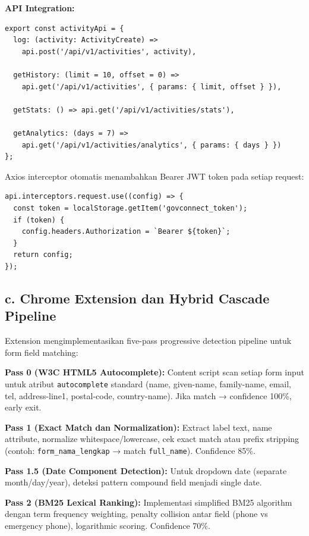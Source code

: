 \documentclass[12pt,a4paper]{article}
\begin{document}
\textbf{API Integration:}

\begin{lstlisting}
export const activityApi = {
  log: (activity: ActivityCreate) =>
    api.post('/api/v1/activities', activity),
  
  getHistory: (limit = 10, offset = 0) =>
    api.get('/api/v1/activities', { params: { limit, offset } }),
  
  getStats: () => api.get('/api/v1/activities/stats'),
  
  getAnalytics: (days = 7) =>
    api.get('/api/v1/activities/analytics', { params: { days } })
};
\end{lstlisting}

Axios interceptor otomatis menambahkan Bearer JWT token pada setiap request:

\begin{lstlisting}
api.interceptors.request.use((config) => {
  const token = localStorage.getItem('govconnect_token');
  if (token) {
    config.headers.Authorization = `Bearer ${token}`;
  }
  return config;
});
\end{lstlisting}

\subsection*{c. Chrome Extension dan Hybrid Cascade Pipeline}

Extension mengimplementasikan five-pass progressive detection pipeline untuk form field matching:

\textbf{Pass 0 (W3C HTML5 Autocomplete):} Content script scan setiap form input untuk atribut \texttt{autocomplete} standard (name, given-name, family-name, email, tel, address-line1, postal-code, country-name). Jika match → confidence 100\%, early exit.

\textbf{Pass 1 (Exact Match dan Normalization):} Extract label text, name attribute, normalize whitespace/lowercase, cek exact match atau prefix stripping (contoh: \texttt{form\_nama\_lengkap} → match \texttt{full\_name}). Confidence 85\%.

\textbf{Pass 1.5 (Date Component Detection):} Untuk dropdown date (separate month/day/year), deteksi pattern compound field menjadi single date.

\textbf{Pass 2 (BM25 Lexical Ranking):} Implementasi simplified BM25 algorithm dengan term frequency weighting, penalty collision antar field (phone vs emergency phone), logarithmic scoring. Confidence 70\%.
\end{document}
